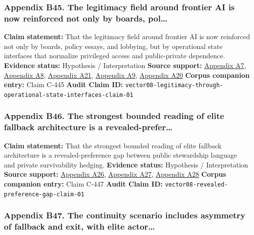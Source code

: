 \documentclass[
  american,
  11pt,
  letterpaper,
]{article}
\begin{document}
\subsubsection{Appendix B45. The legitimacy field around frontier AI is
now reinforced not only by boards,
pol\ldots{}}\label{appendix-b45-the-legitimacy-field-around-frontier-ai-is-now-reinforced-not-only-by-boards-pol}

\textbf{Claim statement:} That the legitimacy field around frontier AI
is now reinforced not only by boards, policy essays, and lobbying, but
by operational state interfaces that normalize privileged access and
public-private dependence. \textbf{Evidence status:} Hypothesis /
Interpretation \textbf{Source support:}
\hyperref[appendix-a7-introducing-openai-for-government]{Appendix A7},
\hyperref[appendix-a8-claude-gov-models-for-u-s-national-security-customers]{Appendix
A8},
\hyperref[appendix-a21-anthropic-and-palantir-partner-to-bring-claude-ai-models-to-aws-for-u-s-government-intelligence-and-defense-operations]{Appendix
A21},
\hyperref[appendix-a9-army-launches-detachment-201-executive-innovation-corps-to-drive-tech-transformation]{Appendix
A9},
\hyperref[appendix-a20-openais-proposals-for-the-us-ai-action-plan]{Appendix
A20} \textbf{Corpus companion entry:} Claim C-445 \textbf{Audit Claim
ID:}
\texttt{vector08-legitimacy-through-operational-state-interfaces-claim-01}

\subsubsection{Appendix B46. The strongest bounded reading of elite
fallback architecture is a
revealed-prefer\ldots{}}\label{appendix-b46-the-strongest-bounded-reading-of-elite-fallback-architecture-is-a-revealed-prefer}

\textbf{Claim statement:} That the strongest bounded reading of elite
fallback architecture is a revealed-preference gap between public
stewardship language and private survivability hedging. \textbf{Evidence
status:} Hypothesis / Interpretation \textbf{Source support:}
\hyperref[appendix-a26-sam-altman-s-manifest-destiny]{Appendix A26},
\hyperref[appendix-a27-inside-mark-zuckerbergs-top-secret-hawaii-compound]{Appendix
A27},
\hyperref[appendix-a28-new-zealand-woos-the-wealthy-with-golden-visa-changes]{Appendix
A28} \textbf{Corpus companion entry:} Claim C-447 \textbf{Audit Claim
ID:} \texttt{vector08-revealed-preference-gap-claim-01}

\subsubsection{Appendix B47. The continuity scenario includes asymmetry
of fallback and exit, with elite
actor\ldots{}}\label{appendix-b47-the-continuity-scenario-includes-asymmetry-of-fallback-and-exit-with-elite-actor}
\end{document}
